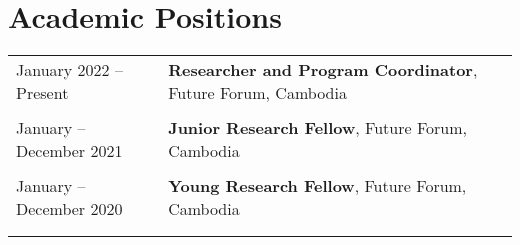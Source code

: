 \documentclass[10pt,a4paper]{article}
\begin{document}
	\section*{Academic Positions}
		\noindent \begin{tabular}{@{} l l}
			
			\vspace{-1em}
			\hspace{1em} January 2022 -- Present & \textbf{Researcher and Program Coordinator}, Future Forum, Cambodia \\
			& \\ 
			
			\vspace{-1em}
			\hspace{1em} January -- December 2021 & \textbf{Junior Research Fellow}, Future Forum, Cambodia \\
			& \\ 
			
			\vspace{-1em}
			\hspace{1em} January -- December 2020 & \textbf{Young Research Fellow}, Future Forum, Cambodia \\
			& \\ 
			
		
			\vspace{-1em}
			
				\end{tabular}   

	
\end{document}

